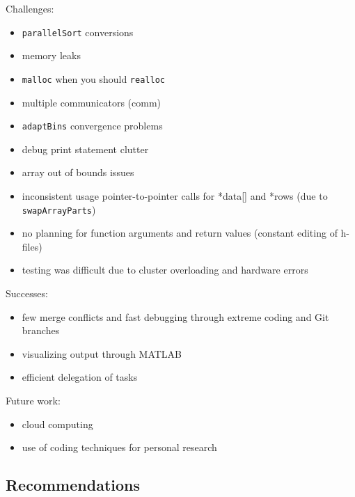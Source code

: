 \documentclass{article}
\begin{document}
\begin{mdframed}[backgroundcolor=red!20]
	Challenges:
	\begin{itemize}
		\item \texttt{parallelSort} conversions
		\item memory leaks
		\item \texttt{malloc} when you should \texttt{realloc}
		\item multiple communicators (comm)
		\item \texttt{adaptBins} convergence problems
		\item debug print statement clutter
		\item array out of bounds issues
		\item inconsistent usage pointer-to-pointer calls for *data[] and *rows (due to \texttt{swapArrayParts})
		\item no planning for function arguments and return values (constant editing of h-files)
		\item testing was difficult due to cluster overloading and hardware errors
	\end{itemize}
\end{mdframed}

\begin{mdframed}[backgroundcolor=green!20]
	Successes:
	\begin{itemize}
		\item few merge conflicts and fast debugging through extreme coding and Git branches
		\item visualizing output through MATLAB
		\item efficient delegation of tasks
	\end{itemize}
\end{mdframed}

\begin{mdframed}[backgroundcolor=blue!20]
	Future work:
	\begin{itemize}
		\item cloud computing
		\item use of coding techniques for personal research
	\end{itemize}
\end{mdframed}

%
%

\subsection{Recommendations}
\end{document}
